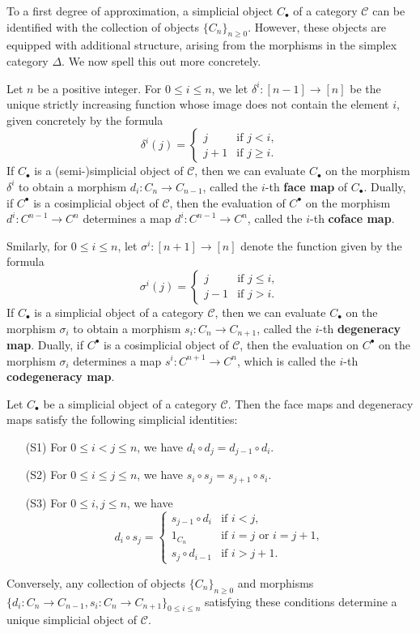 To a first degree of approximation, a simplicial object $C_\bullet$ of a category $\mathcal{C}$ can be identified with the collection of objects $\{C_n\}_{n\geq 0}$. However, these objects are equipped with additional structure, arising from the morphisms in the simplex category $\Delta$. We now spell this out more concretely.\par
Let $n$ be a positive integer. For $0\leq i\leq n$, we let $\delta^i:[n-1]\to[n]$ be the unique strictly increasing function whose image does not contain the element $i$, given concretely by the formula
\[\delta^i(j)=\begin{cases}
j&\text{if $j<i$},\\
j+1&\text{if $j\geq i$}.
\end{cases}\]
If $C_\bullet$ is a (semi-)simplicial object of $\mathcal{C}$, then we can evaluate $C_\bullet$ on the morphism $\delta^i$ to obtain a morphism $d_i:C_n\to C_{n-1}$, called the $i$-th \textbf{face map} of $C_\bullet$. Dually, if $C^\bullet$ is a cosimplicial object of $\mathcal{C}$, then the evaluation of $C^\bullet$ on the morphism $d^i:C^{n-1}\to C^n$ determines a map $d^i:C^{n-1}\to C^n$, called the $i$-th \textbf{coface map}.\par
Smilarly, for $0\leq i\leq n$, let $\sigma^i:[n+1]\to[n]$ denote the function given by the formula
\[\sigma^i(j)=\begin{cases}
j&\text{if $j\leq i$},\\
j-1&\text{if $j>i$}.
\end{cases}\]
If $C_\bullet$ is a simplicial object of a category $\mathcal{C}$, then we can evaluate $C_\bullet$ on the morphism $\sigma_i$ to obtain a morphism $s_i:C_n\to C_{n+1}$, called the $i$-th \textbf{degeneracy map}. Dually, if $C^\bullet$ is a cosimplicial object of $\mathcal{C}$, then the evaluation on $C^\bullet$ on the morphism $\sigma_i$ determines a map $s^i:C^{n+1}\to C^n$, which is called the $i$-th \textbf{codegeneracy map}.
\begin{proposition}\label{simplicial set face degeneracy map char}
Let $C_\bullet$ be a simplicial object of a category $\mathcal{C}$. Then the face maps and degeneracy maps satisfy the following simplicial identities:
\begin{itemize}
\item[(S1)] For $0\leq i<j\leq n$, we have $d_i\circ d_j=d_{j-1}\circ d_i$.
\item[(S2)] For $0\leq i\leq j\leq n$, we have $s_i\circ s_j=s_{j+1}\circ s_i$.
\item[(S3)] For $0\leq i,j\leq n$, we have
\[d_i\circ s_j=\begin{cases}
s_{j-1}\circ d_i&\text{if $i<j$},\\
1_{C_n}&\text{if $i=j$ or $i=j+1$},\\
s_j\circ d_{i-1}&\text{if $i>j+1$}.
\end{cases}\] 
\end{itemize}
Conversely, any collection of objects $\{C_n\}_{n\geq 0}$ and morphisms $\{d_i:C_n\to C_{n-1},s_i:C_n\to C_{n+1}\}_{0\leq i\leq n}$ satisfying these conditions determine a unique simplicial object of $\mathcal{C}$.
\end{proposition}
